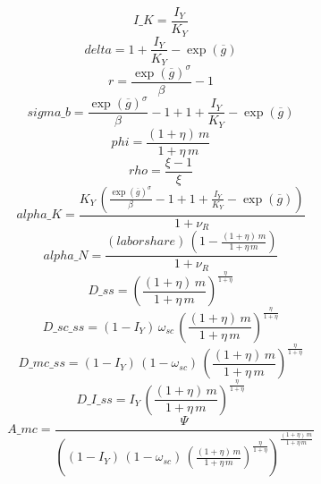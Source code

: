 \begin{dmath*}
I\_K = \frac{{{I_Y}}}{{{K_Y}}}
\end{dmath*}
\begin{dmath*}
delta = 1+\frac{{{I_Y}}}{{{K_Y}}}-\exp\left({{\overline{g}}}\right)
\end{dmath*}
\begin{dmath*}
r = \frac{\exp\left({{\overline{g}}}\right)^{{{\sigma}}}}{{{\beta}}}-1
\end{dmath*}
\begin{dmath*}
sigma\_b = \frac{\exp\left({{\overline{g}}}\right)^{{{\sigma}}}}{{{\beta}}}-1+1+\frac{{{I_Y}}}{{{K_Y}}}-\exp\left({{\overline{g}}}\right)
\end{dmath*}
\begin{dmath*}
phi = \frac{\left(1+{{\eta}}\right)\, {{m}}}{1+{{\eta}}\, {{m}}}
\end{dmath*}
\begin{dmath*}
rho = \frac{{\xi}-1}{{\xi}}
\end{dmath*}
\begin{dmath*}
alpha\_K = \frac{{{K_Y}}\, \left(\frac{\exp\left({{\overline{g}}}\right)^{{{\sigma}}}}{{{\beta}}}-1+1+\frac{{{I_Y}}}{{{K_Y}}}-\exp\left({{\overline{g}}}\right)\right)}{1+{{\nu_R}}}
\end{dmath*}
\begin{dmath*}
alpha\_N = \frac{{(labor share)}\, \left(1-\frac{\left(1+{{\eta}}\right)\, {{m}}}{1+{{\eta}}\, {{m}}}\right)}{1+{{\nu_R}}}
\end{dmath*}
\begin{dmath*}
D\_ss = \left(\frac{\left(1+{{\eta}}\right)\, {{m}}}{1+{{\eta}}\, {{m}}}\right)^{\frac{{{\eta}}}{1+{{\eta}}}}
\end{dmath*}
\begin{dmath*}
D\_sc\_ss = \left(1-{{I_Y}}\right)\, {\omega_{sc}}\, \left(\frac{\left(1+{{\eta}}\right)\, {{m}}}{1+{{\eta}}\, {{m}}}\right)^{\frac{{{\eta}}}{1+{{\eta}}}}
\end{dmath*}
\begin{dmath*}
D\_mc\_ss = \left(1-{{I_Y}}\right)\, \left(1-{\omega_{sc}}\right)\, \left(\frac{\left(1+{{\eta}}\right)\, {{m}}}{1+{{\eta}}\, {{m}}}\right)^{\frac{{{\eta}}}{1+{{\eta}}}}
\end{dmath*}
\begin{dmath*}
D\_I\_ss = {{I_Y}}\, \left(\frac{\left(1+{{\eta}}\right)\, {{m}}}{1+{{\eta}}\, {{m}}}\right)^{\frac{{{\eta}}}{1+{{\eta}}}}
\end{dmath*}
\begin{dmath*}
A\_mc = \frac{{{\Psi}}}{\left(\left(1-{{I_Y}}\right)\, \left(1-{\omega_{sc}}\right)\, \left(\frac{\left(1+{{\eta}}\right)\, {{m}}}{1+{{\eta}}\, {{m}}}\right)^{\frac{{{\eta}}}{1+{{\eta}}}}\right)^{\frac{\left(1+{{\eta}}\right)\, {{m}}}{1+{{\eta}}\, {{m}}}}}
\end{dmath*}

